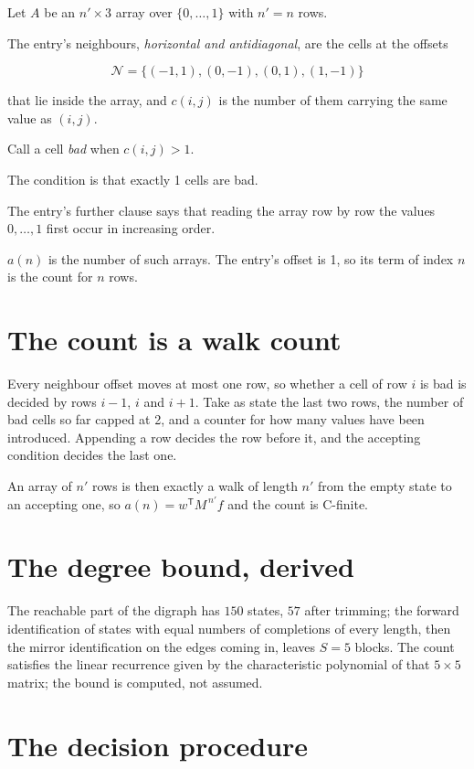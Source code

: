 \documentclass[11pt]{article}
\theoremstyle{definition}
\begin{document}
Let $A$ be an $n' \times 3$ array over $\{0,\dots,1\}$ with $n' = n$ rows.

The entry's neighbours, {\itshape horizontal and antidiagonal}, are the cells at the offsets

\[\mathcal{N} = \{(-1,1), (0,-1), (0,1), (1,-1)\}\]

that lie inside the array, and $c(i,j)$ is the number of them carrying the same value as $(i,j)$.

Call a cell {\itshape bad} when $c(i,j) > 1$.

The condition is that exactly 1 cells are bad.

The entry's further clause says that reading the array row by row the values $0,\dots,1$ first occur in increasing order.

$a(n)$ is the number of such arrays. The entry's offset is 1, so its term of index $n$ is the count for $n$ rows.

\section{The count is a walk count}

Every neighbour offset moves at most one row, so whether a cell of row $i$ is bad is decided by rows $i-1$, $i$ and $i+1$. Take as state the last two rows, the number of bad cells so far capped at 2, and a counter for how many values have been introduced. Appending a row decides the row before it, and the accepting condition decides the last one.

An array of $n'$ rows is then exactly a walk of length $n'$ from the empty state to an accepting one, so $a(n) = w^{\mathsf T}M^{\,n'}f$ and the count is C-finite.

\section{The degree bound, derived}

The reachable part of the digraph has $150$ states, $57$ after trimming; the forward identification of states with equal numbers of completions of every length, then the mirror identification on the edges coming in, leaves $S = 5$ blocks. The count satisfies the linear recurrence given by the characteristic polynomial of that $5\times5$ matrix; the bound is computed, not assumed.

\section{The decision procedure}
\end{document}
